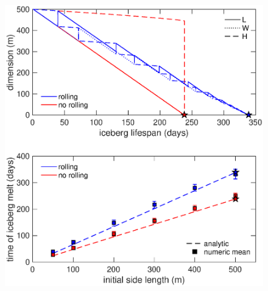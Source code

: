 \documentclass[twocol]{ametsoc_tw}
\begin{document}
 \begin{figure}[!t]
 \begin{center}
 \hspace{-.5 cm} 
\includegraphics[width=\linewidth]{Figs/Analytic_Numeric_Rolling_500m}

\end{center}
\end{figure}
\end{document}
